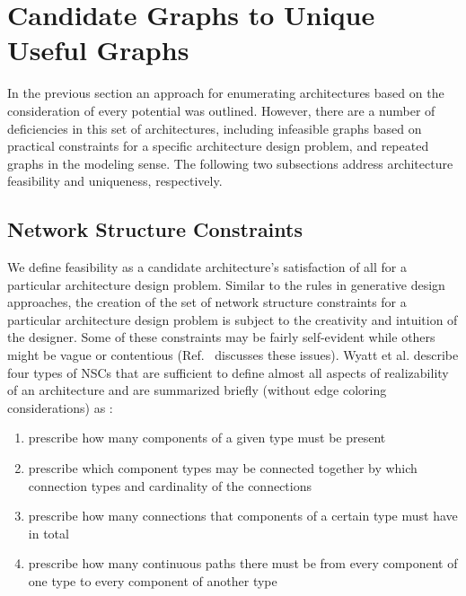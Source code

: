\section{Candidate Graphs to Unique Useful Graphs}

In the previous section an approach for enumerating architectures based on the consideration of every potential \mypm{} was outlined. However, there are a number of deficiencies in this set of architectures, including infeasible graphs based on practical constraints for a specific architecture design problem, and repeated graphs in the modeling sense. The following two subsections address architecture feasibility and uniqueness, respectively.

\subsection{Network Structure Constraints\label{sec:ch2:NSC}}

We define feasibility as a candidate architecture's satisfaction of all  for a particular architecture design problem. Similar to the rules in generative design approaches, the creation of the set of network structure constraints for a particular architecture design problem is subject to the creativity and intuition of the designer. Some of these constraints may be fairly self-evident while others might be vague or contentious (Ref.~\cite{Wyatt2012a} discusses these issues). Wyatt et al. describe four types of NSCs that are sufficient to define almost all aspects of realizability of an architecture and are summarized briefly (without edge coloring considerations) as \cite{Wyatt2012a}:
\begin{enumerate}[label=$\bullet$, widest=$\bullet$, nosep]
\item {} prescribe how many components of a given type must be present
\item {} prescribe which component types may be connected together by which connection types and cardinality of the connections
\item {} prescribe how many connections that components of a certain type must have in total
\item {} prescribe how many continuous paths there must be from every component of one type to every component of another type
\end{enumerate}

